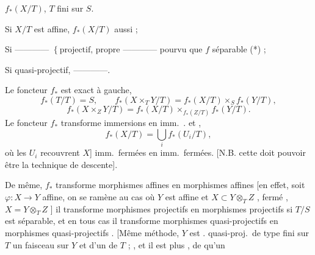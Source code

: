 \documentclass[11pt,a4paper]{article}
\begin{document}


$f_{*}(X/T)$, \quad $T$ fini sur $S$.

Si $X/T$ est affine, $f_{*}(X/T)$ aussi ;

Si \quad ———— $\left\{\text{projectif, propre}\right.$ \quad ———— \quad pourvu que $f$ séparable (*) ;

Si \quad quasi-projectif, \quad ————.

Le foncteur $f_{*}$ est exact à gauche,  
\[
  f_{*}(T/T)=S,\qquad f_{*}(X\times_T Y/T)=f_{*}(X/T)\times_S f_{*}(Y/T),
\]
\[
  f_{*}(X\times_Z Y/T)=f_{*}(X/T)\times_{f_{*}(Z/T)}f_{*}(Y/T).
\]
Le foncteur $f_{*}$ transforme immersions  en imm.\ . 
et  \ill{}   \ill{}, \struck{[\ill{} \ill{}]}
\[
  f_{*}(X/T)=\bigcup_i f_{*}(U_i/T),
\]
où les $U_i$ recouvrent $X$]
imm.\ fermées en imm.\ fermées. \struck{\ill{} \ill{} \ill{}}
[N.B. cette  doit pouvoir être \ill{} \ill{} la technique de descente].

De même, $f_{*}$ transforme  morphismes affines en morphismes
affines [en effet, soit $\varphi\colon X\to Y$ affine, \struck{\ill{}} on se ramène  au cas où
$Y$ est affine et $X\subset Y\otimes_T Z$ \struck{\ill{}},   fermé \ill{} \ill{},
\ill{}  $X=Y\otimes_T Z$  \ill{}   \ill{}  ] il transforme morphismes projectifs en
morphismes projectifs si $T/S$ est séparable, et en tous cas il transforme morphismes
quasi-projectifs en morphismes quasi-projectifs .
[Même méthode,  \ill{} $Y$ est . \struck{\ill{}}
\ill{} quasi-proj.\ de type fini sur $T$  un faisceau  sur $Y$ et \ill{}
d'un \ill{} de $T$ ; \ill{} \ill{} \ill{}
, et il est plus , de \ill{} \ill{} qu'un
\end{document}

